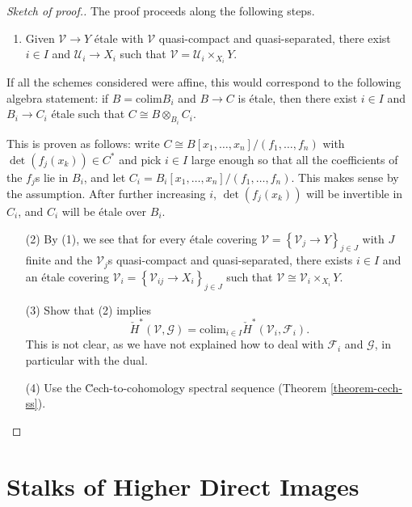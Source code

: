\begin{proof}[Sketch of proof.]
The proof proceeds along the following steps.
\begin{enumerate}
\item Given $\mathcal{V}\to Y$ \'etale with $\mathcal{V}$ quasi-compact and 
quasi-separated, there exist $i\in I$ and $\mathcal{U}_i \to X_i$ such that 
$\mathcal{V} = \mathcal{U}_i \times_{X_i} Y$.
\end{enumerate}
If all the schemes considered were affine, this would correspond to the 
following algebra statement: if $B=\text{colim} B_i$ and $B\to C$ is \'etale, 
then there exist $i\in I$ and $B_i\to C_i$ \'etale such that $C \cong B 
\otimes_{B_i} C_i$. 

\medskip\noindent
This is proven as follows: write $C \cong B\left[x_1,\ldots, x_n\right]/(f_1, 
\ldots, f_n)$ with $\det (f_j(x_k)) \in C^*$ and pick $i\in I$ large enough so 
that all the coefficients of the $f_j$s lie in $B_i$, and let $C_i = 
B_i\left[x_1, \ldots, x_n\right]/(f_1, \dots, f_n)$. This makes sense by the 
assumption. After further increasing $i$, $\det (f_j(x_k))$ will be invertible 
in $C_i$, and $C_i$ will be \'etale over $B_i$.
\begin{enumerate}
\item[(2)]
By (1), we see that for every \'etale covering $\mathcal{V} = 
\left\{\mathcal{V}_j\to Y\right\}_{j\in J}$ with $J$ finite and the 
$\mathcal{V}_j$s quasi-compact and quasi-separated, there exists $i\in I$ and 
an \'etale covering $\mathcal{V}_i = \left\{\mathcal{V}_{ij} \to X_i 
\right\}_{j\in J}$ such that $\mathcal{V} \cong \mathcal{V}_i\times_{X_i} Y$. 
\item[(3)]
Show that (2) implies 
$$
\check H^*(\mathcal{V}, \mathcal{G})=\text{colim}_{i\in I}\check 
H^*(\mathcal{V}_i, \mathcal{F}_i).
$$ 
This is not clear, as we have not explained how to deal with $\mathcal{F}_i$ 
and $\mathcal{G}$, in particular with the dual.
\item[(4)] Use the \u Cech-to-cohomology spectral sequence
(Theorem \ref{theorem-cech-ss}). 
\end{enumerate}
\end{proof}





\section{Stalks of Higher Direct Images}
\label{section-stalks-direct-image}

